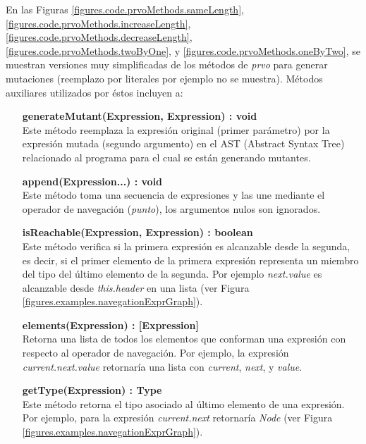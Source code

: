 En las Figuras \ref{figures.code.prvoMethods.sameLength}, \ref{figures.code.prvoMethods.increaseLength}, \ref{figures.code.prvoMethods.decreaseLength}, \ref{figures.code.prvoMethods.twoByOne}, y \ref{figures.code.prvoMethods.oneByTwo}, se muestran versiones muy simplificadas de los m\'etodos de \emph{prvo} para generar mutaciones (reemplazo por literales por ejemplo no se muestra). M\'etodos auxiliares utilizados por \'estos incluyen a:

\begin{enumerate}[leftmargin=.75cm,align=left]
	\item[\textbf{generateMutant(Expression, Expression) : void}]\mbox{}\\ Este m\'etodo reemplaza la expresi\'on original (primer par\'ametro) por la expresi\'on mutada (segundo argumento) en el AST (Abstract Syntax Tree) relacionado al programa para el cual se est\'an generando mutantes.
	
	\item[\textbf{append(Expression...) : void}]\mbox{}\\ Este m\'etodo toma una secuencia de expresiones y las une mediante el operador de navegaci\'on (\emph{punto}), los argumentos nulos son ignorados.
	
	\item[\textbf{isReachable(Expression, Expression) : boolean}]\mbox{}\\ Este m\'etodo verifica si la primera expresi\'on es alcanzable desde la segunda, es decir, si el primer elemento de la primera expresi\'on representa un miembro del tipo del \'ultimo elemento de la segunda. Por ejemplo \emph{next.value} es alcanzable desde \emph{this.header} en una lista (ver Figura \ref{figures.examples.navegationExprGraph}).
	
	\item[\textbf{elements(Expression) : [Expression]}]\mbox{}\\ Retorna una lista de todos los elementos que conforman una expresi\'on con respecto al operador de navegaci\'on. Por ejemplo, la expresi\'on \emph{current.next.value} retornar\'ia una lista con \emph{current}, \emph{next}, y \emph{value}.
	
	\item[\textbf{getType(Expression) : Type}]\mbox{}\\ Este m\'etodo retorna el tipo asociado al \'ultimo elemento de una expresi\'on. Por ejemplo, para la expresi\'on \emph{current.next} retornar\'ia \emph{Node} (ver Figura \ref{figures.examples.navegationExprGraph}).
	

\end{enumerate}
